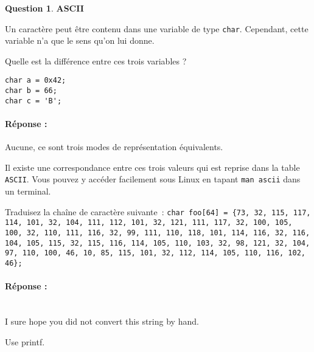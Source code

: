 \documentclass[11pt,a4paper,dvipsnames]{article}
\theoremstyle{definition}%
\newtheorem{Q}{Question}[] %
\newcommand{\reponse}[1]{%
	\ifthenelse {\boolean{corrige}} {\paragraph{Réponse :}
    \color{darkblue} #1 \color{black}} {}
 }
\begin{document}
\begin{Q} \textbf{ASCII}

Un caractère peut être contenu dans une variable de type \texttt{char}.
Cependant, cette variable n'a que le sens qu'on lui donne.

Quelle est la différence entre ces trois variables ?

\begin{verbatim}
char a = 0x42;
char b = 66;
char c = 'B';
\end{verbatim}

\reponse{
Aucune, ce sont trois modes de représentation équivalents.
}

Il existe une correspondance entre ces trois valeurs qui est reprise dans la table \texttt{ASCII}.
Vous pouvez y accéder facilement sous Linux en tapant \texttt{man ascii} dans un terminal.

Traduisez la chaîne de caractère suivante~: \texttt{char foo[64] = \{73, 32, 115, 117, 114, 101, 32, 104, 111, 112, 101, 32, 121, 111, 117, 32, 100, 105, 100, 32, 110, 111, 116, 32, 99, 111, 110, 118, 101, 114, 116, 32, 116, 104, 105, 115, 32, 115, 116, 114, 105, 110, 103, 32, 98, 121, 32, 104, 97, 110, 100, 46, 10, 85, 115, 101, 32, 112, 114, 105, 110, 116, 102, 46\};}

\reponse{~\\

I sure hope you did not convert this string by hand.

Use printf.}
\end{Q}
\end{document}
